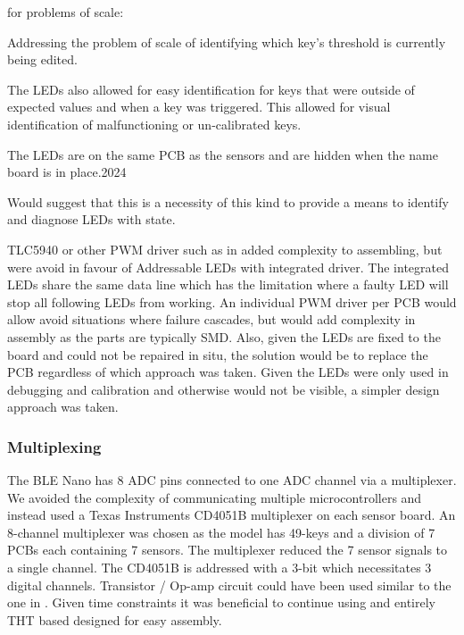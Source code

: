 for problems of scale:

Addressing the problem of scale of identifying which key's threshold is
currently being edited.

The LEDs also allowed for easy identification for keys that were outside
of expected values and when a key was triggered. This allowed for visual
identification of malfunctioning or un-calibrated keys.

The LEDs are on the same PCB as the sensors and are hidden when the
name board is in place.2024

Would suggest that this is a necessity of this kind to provide a means
to identify and diagnose LEDs with state.

TLC5940 or other PWM driver such as in \cite{McPherson2013} added
complexity to assembling, but were avoid in favour of Addressable LEDs
with integrated driver. The integrated LEDs share the same data line
which has the limitation where a faulty LED will stop all following LEDs
from working. An individual PWM driver per PCB would allow avoid
situations where failure cascades, but would add complexity in assembly
as the parts are typically SMD. Also, given the LEDs are fixed to the
board and could not be repaired in situ, the solution would be to
replace the PCB regardless of which approach was taken. Given the LEDs
were only used in debugging and calibration and otherwise would not be
visible, a simpler design approach was taken.

\subsubsection{Multiplexing}\label{multiplexing}


The BLE Nano has 8 ADC pins connected to one ADC channel via a multiplexer. 
We avoided the complexity of communicating multiple microcontrollers and instead used a Texas Instruments CD4051B multiplexer on each sensor board.
An 8-channel multiplexer was chosen as the model has 49-keys and a division of 7 PCBs each containing 7 sensors.
The multiplexer reduced the 7 sensor signals to a single channel. The CD4051B is addressed with a 3-bit which necessitates 3 digital channels.
Transistor / Op-amp circuit could have been used similar to the one in
\cite{McPherson2013}. Given time constraints it was beneficial to continue using and entirely THT based designed for easy assembly.


